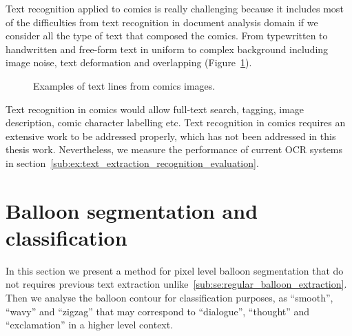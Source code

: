 Text recognition applied to comics is really challenging because it includes most of the difficulties from text recognition in document analysis domain if we consider all the type of text that composed the comics.
From typewritten to handwritten and free-form text in uniform to complex background including image noise, text deformation and overlapping (Figure~\ref{fig:in:texlines_example}).

 \begin{figure}[!ht]  %
   \centering
  \caption[Examples of text lines from comics images]{Examples of text lines from comics images.}
  \label{fig:in:texlines_example}
 \end{figure}

Text recognition in comics would allow full-text search, tagging, image description, comic character labelling etc.
Text recognition in comics requires an extensive work to be addressed properly, which has not been addressed in this thesis work.
Nevertheless, we measure the performance of current OCR systems in section~\ref{sub:ex:text_extraction_recognition_evaluation}.


\section{Balloon segmentation and classification}
\label{sec:in:balloon}

In this section we present a method for pixel level balloon segmentation that do not requires previous text extraction unlike~\ref{sub:se:regular_balloon_extraction}.
Then we analyse the balloon contour for classification purposes, as ``smooth'', ``wavy'' and ``zigzag'' that may correspond to ``dialogue'', ``thought'' and ``exclamation'' in a higher level context.

